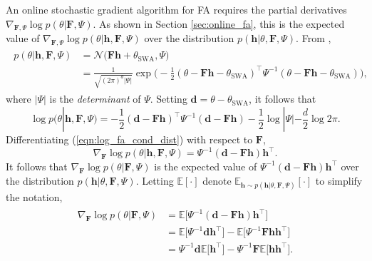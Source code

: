 \documentclass[msc,deptreport.inf]{infthesis} %
\newcommand{\matr}[1]{\mathbf{#1}}
\newcommand{\E}{\mathbb E}
\begin{document}
An online stochastic gradient algorithm for FA requires the partial derivatives $\nabla_{\matr{F}, \Psi} \log p(\theta | \matr{F}, \Psi)$. As shown in Section \ref{sec:online_fa}, this is the expected value of $\nabla_{\matr{F}, \Psi} \log p(\theta | \matr{h}, \matr{F}, \Psi)$ over the distribution $p(\matr{h} | \theta, \matr{F}, \Psi)$. From \cite{barber2007}, 
\begin{align}
\begin{split}
	p(\theta | \matr{h}, \matr{F}, \Psi)
	& = \mathcal{N}\Big( \matr{Fh} + \theta_{\text{SWA}}, \Psi \Big) \\
	& = \frac{1}{\sqrt{(2\pi)^d |\Psi|}} 
	\exp \Big(-\frac{1}{2} (\theta - \matr{Fh} - \theta_{\text{SWA}})^\intercal \Psi^{-1} (\theta - \matr{Fh} 	- \theta_{\text{SWA}})\Big),
\end{split}
\end{align}
where $|\Psi|$ is the \emph{determinant} of $\Psi$. Setting $\matr{d} = \theta - \theta_{\text{SWA}}$, it follows that
\begin{equation}\label{eqn:log_fa_cond_dist}
	\log p(\theta | \matr{h}, \matr{F}, \Psi)
	= -\frac{1}{2} (\matr{d} - \matr{Fh})^\intercal \Psi^{-1} (\matr{d}- \matr{Fh}) - \frac{1}{2} \log |\Psi| - \frac{d}{2} \log 2\pi.
\end{equation}
Differentiating (\ref{eqn:log_fa_cond_dist}) with respect to $\matr{F}$,
\begin{equation}
	\nabla_{\matr{F}} \log p(\theta | \matr{h}, \matr{F}, \Psi)
	= \Psi^{-1} (\matr{d} - \matr{Fh}) \matr{h}^\intercal.
\end{equation}
It follows that $\nabla_{\matr{F}} \log p(\theta | \matr{F}, \Psi)$ is the expected value of $\Psi^{-1} (\matr{d} - \matr{Fh}) \matr{h}^\intercal$ over the distribution $p(\matr{h} | \theta, \matr{F}, \Psi)$. Letting $\E[\cdot]$ denote $\E_{\matr{h} \sim p(\matr{h} | \theta, \matr{F}, \Psi)}[\cdot]$ to simplify the notation, 
\begin{align}\label{eqn:derivatives_wrt_F}
\begin{split}
	\nabla_{\matr{F}} \log p(\theta | \matr{F}, \Psi) 
	& = \E \big[ \Psi^{-1} (\matr{d} - \matr{Fh}) \matr{h}^\intercal \big] \\
	& = \E \big[ \Psi^{-1} \matr{d} \matr{h}^\intercal \big] 
	- \E \big[ \Psi^{-1} \matr{Fh} \matr{h}^\intercal \big] \\
	& = \Psi^{-1} \matr{d} \E \big[ \matr{h}^\intercal \big] 
	- \Psi^{-1} \matr{F}  \E \big[ \matr{h} \matr{h}^\intercal \big].
\end{split}
\end{align} 
\end{document}

